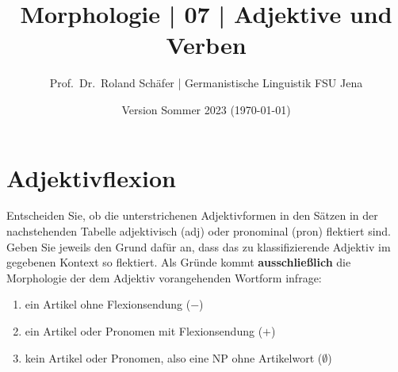 \documentclass[12pt,a4paper,twoside]{article}
\author{Prof.\ Dr.\ Roland Schäfer | Germanistische Linguistik FSU Jena}
\title{Morphologie | 07 | Adjektive und Verben}
\date{Version Sommer 2023 (\today)}
\newcommand{\Zeile}{\vspace{\baselineskip}}
\newcommand{\Lf}{
  \setlength{\itemsep}{1pt}
  \setlength{\parskip}{0pt}
  \setlength{\parsep}{0pt}
}
\begin{document}
\maketitle

\Zeile

\section{Adjektivflexion}

Entscheiden Sie, ob die unterstrichenen Adjektivformen in den Sätzen in der nachstehenden Tabelle adjektivisch (adj) oder pronominal (pron) flektiert sind.
Geben Sie jeweils den Grund dafür an, dass das zu klassifizierende Adjektiv im gegebenen Kontext so flektiert.
Als Gründe kommt \textbf{ausschließlich} die Morphologie der dem Adjektiv vorangehenden Wortform infrage:

\begin{enumerate}\Lf
  \item ein Artikel ohne Flexionsendung ($-$)
  \item ein Artikel oder Pronomen mit Flexionsendung ($+$)
  \item kein Artikel oder Pronomen, also eine NP ohne Artikelwort ($\emptyset$)
\end{enumerate}
\end{document}
